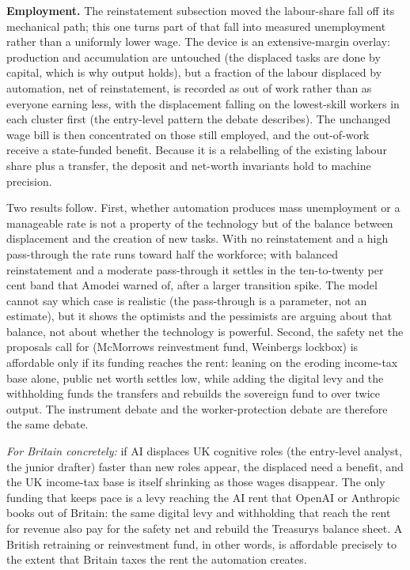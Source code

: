 \documentclass[12pt]{article}
\begin{document}
\textbf{Employment.} The reinstatement subsection moved the labour-share
fall off its mechanical path; this one turns part of that fall into
measured unemployment rather than a uniformly lower wage. The device is
an extensive-margin overlay: production and accumulation are untouched
(the displaced tasks are done by capital, which is why output holds),
but a fraction of the labour displaced by automation, net of
reinstatement, is recorded as out of work rather than as everyone
earning less, with the displacement falling on the lowest-skill workers
in each cluster first (the entry-level pattern the debate describes).
The unchanged wage bill is then concentrated on those still employed,
and the out-of-work receive a state-funded benefit. Because it is a
relabelling of the existing labour share plus a transfer, the deposit
and net-worth invariants hold to machine precision.

Two results follow. First, whether automation produces mass unemployment
or a manageable rate is not a property of the technology but of the
balance between displacement and the creation of new tasks. With no
reinstatement and a high pass-through the rate runs toward half the
workforce; with balanced reinstatement and a moderate pass-through it
settles in the ten-to-twenty per cent band that Amodei warned of, after
a larger transition spike. The model cannot say which case is realistic
(the pass-through is a parameter, not an estimate), but it shows the
optimists and the pessimists are arguing about that balance, not about
whether the technology is powerful. Second, the safety net the proposals
call for (McMorrow\textquotesingle s reinvestment fund,
Weinberg\textquotesingle s lockbox) is affordable only if its funding
reaches the rent: leaning on the eroding income-tax base alone, public
net worth settles low, while adding the digital levy and the withholding
funds the transfers and rebuilds the sovereign fund to over twice
output. The instrument debate and the worker-protection debate are
therefore the same debate.

\emph{For Britain concretely:} if AI displaces UK cognitive roles (the
entry-level analyst, the junior drafter) faster than new roles appear,
the displaced need a benefit, and the UK income-tax base is itself
shrinking as those wages disappear. The only funding that keeps pace is
a levy reaching the AI rent that OpenAI or Anthropic books out of
Britain: the same digital levy and withholding that reach the rent for
revenue also pay for the safety net and rebuild the
Treasury\textquotesingle s balance sheet. A British retraining or
reinvestment fund, in other words, is affordable precisely to the extent
that Britain taxes the rent the automation creates.
\end{document}
